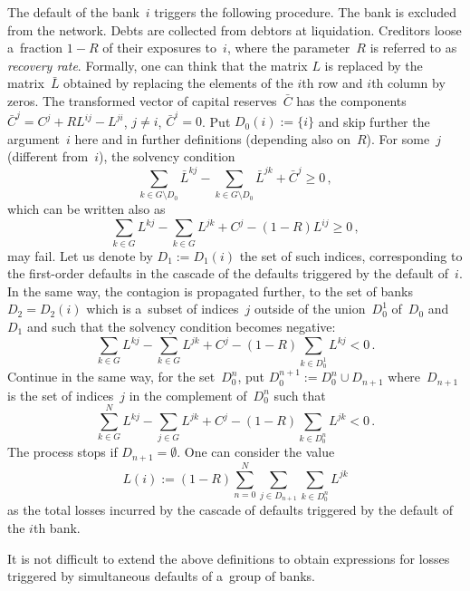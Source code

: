 \begin{multicols}{2}
The default of the bank~$i$ triggers the following procedure. The bank is 
excluded from the network.  
Debts are collected from debtors at liquidation. Creditors loose a~fraction $1-
R$  
of their exposures to~$i$, where the parameter~$R$ is referred to as {\it 
recovery rate}. Formally, one can think that the matrix $L$ is replaced 
by the matrix~$\bar L$ obtained by replacing the elements of the $i$th row and 
$i$th column by zeros. The transformed vector of capital reserves~$\bar C$ has
the components   $\bar C^j=C^j+RL^{ij}-L^{ji}$, $j\neq i$, $\bar C^i=0$. Put 
$D_0(i):=\{i\}$ and skip further the argument~$i$ here and in further 
definitions (depending also on~$R$). For some~$j$ (different from~$i$),  the 
solvency condition 
\begin{equation*}
\sum\limits_{k\in G\setminus D_0}\bar L^{kj}-\sum\limits_{k\in G\setminus D_0}\bar L^{jk}+  
\bar C^j\ge 0\,,  
\end{equation*}
which can be written also as 
\begin{equation*}
\sum\limits_{k\in G}L^{kj}-\sum\limits_{k\in G} L^{jk}+  C^j- (1- R)L^{ij}\ge 0\,,  
\end{equation*}
may fail. Let us denote by $D_1:=D_1(i)$ the set of such indices, corresponding  to 
the first-order defaults in the cascade of the defaults 
triggered by  the default of~$i$. In the same way,  the contagion is propagated 
further, to the set of banks $D_2=D_2(i)$ which is a~subset of 
indices~$j$ outside of the union~$D_0^1$ of~$D_0$ and~$D_1$  and  such that the 
solvency condition becomes negative:
$$
\sum\limits_{k\in G}L^{kj}-\sum\limits_{k\in G} L^{jk}+  C^j- (1-R)\sum\limits_{k\in D_0^1}L^{kj}< 0\,.   
$$
Continue in the same way, for the set~$D_0^n$,  put  $D_0^{n+1}:=D_0^n\cup 
D_{n+1}$ where~$D_{n+1}$ is the set of indices~$j$ in the complement of~$D_0^n$ 
such that
$$
\sum\limits_{k\in G}^NL^{kj}-\sum\limits_{j\in G} L^{jk}+  C^j- (1-R)\sum\limits_{k\in D_0^n}L^{jk}< 
0\,. 
$$
The process stops if $D_{n+1}=\emptyset$. One can consider the value 
$$
L(i):=(1-R)\sum\limits_{n=0}^N\sum\limits_{j\in D_{n+1}}\sum\limits_{k\in D_0^n}L^{jk} 
$$ 
as the total losses incurred by the cascade of defaults triggered by the default 
of the $i$th bank. 

It is not difficult to extend the above definitions to obtain expressions for 
losses triggered by  simultaneous defaults
of a~group of banks.  

\vspace*{-4pt}



\end{multicols}

